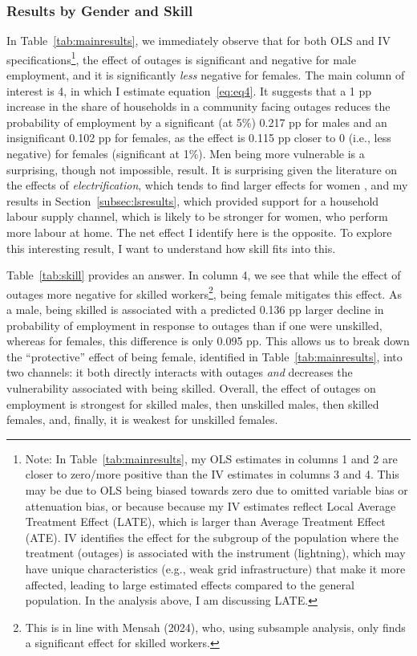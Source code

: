 \documentclass[12pt]{article}
\begin{document}
\subsubsection{Results by Gender and Skill} \label{sec:genderskill}
In Table~\ref{tab:mainresults}, we immediately observe that for both OLS and IV specifications\footnote{Note: In Table~\ref{tab:mainresults}, my OLS estimates in columns 1 and 2 are closer to zero/more positive than the IV estimates in columns 3 and 4. This may be due to OLS being biased towards zero due to omitted variable bias or attenuation bias, or because because my IV estimates reflect Local Average Treatment Effect (LATE), which is larger than Average Treatment Effect (ATE). IV identifies the effect for the subgroup of the population where the treatment (outages) is associated with the instrument (lightning), which may have unique characteristics (e.g., weak grid infrastructure) that make it more affected, leading to large estimated effects compared to the general population. In the analysis above, I am discussing LATE.}, the effect of outages is significant and negative for male employment, and it is significantly \textit{less} negative for females. The main column of interest is 4, in which I estimate equation~\ref{eq:eq4}. It suggests that a 1 pp increase in the share of households in a community facing outages reduces the probability of employment by a significant (at 5\%) 0.217 pp for males and an insignificant 0.102 pp for females, as the effect is 0.115 pp closer to 0 (i.e., less negative) for females (significant at 1\%). Men being more vulnerable is a surprising, though not impossible, result. It is surprising given the literature on the effects of \textit{electrification}, which tends to find larger effects for women \cite{dasso2015a} \cite{dinkelman2011a} \cite{grogan2013a}, and my results in Section~\ref{subsec:lsresults}, which provided support for a household labour supply channel, which is likely to be stronger for women, who perform more labour at home. The net effect I identify here is the opposite. To explore this interesting result, I want to understand how skill fits into this.
\par
Table~\ref{tab:skill} provides an answer. In column 4, we see that while the effect of outages more negative for skilled workers\footnote{This is in line with Mensah (2024), who, using subsample analysis, only finds a significant effect for skilled workers.}, being female mitigates this effect. As a male, being skilled is associated with a predicted 0.136 pp larger decline in probability of employment in response to outages than if one were unskilled, whereas for females, this difference is only 0.095 pp. This allows us to break down the “protective” effect of being female, identified in Table~\ref{tab:mainresults}, into two channels: it both directly interacts with outages \textit{and} decreases the vulnerability associated with being skilled. Overall, the effect of outages on employment is strongest for skilled males, then unskilled males, then skilled females, and, finally, it is weakest for unskilled females. 
\end{document}
